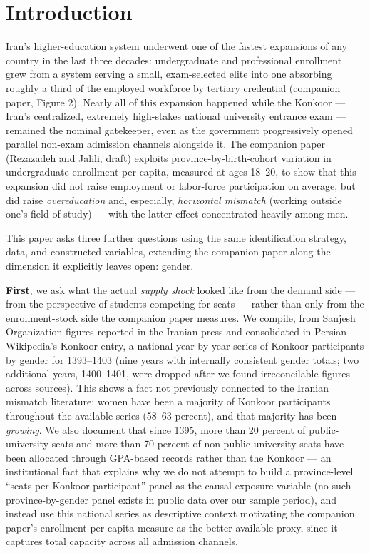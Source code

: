 \documentclass[11pt]{article}
\begin{document}
\section{Introduction}

Iran's higher-education system underwent one of the fastest expansions of any country in the last three decades: undergraduate and professional enrollment grew from a system serving a small, exam-selected elite into one absorbing roughly a third of the employed workforce by tertiary credential (companion paper, Figure 2). Nearly all of this expansion happened while the Konkoor --- Iran's centralized, extremely high-stakes national university entrance exam --- remained the nominal gatekeeper, even as the government progressively opened parallel non-exam admission channels alongside it. The companion paper (Rezazadeh and Jalili, draft) exploits province-by-birth-cohort variation in undergraduate enrollment per capita, measured at ages 18--20, to show that this expansion did not raise employment or labor-force participation on average, but did raise \emph{overeducation} and, especially, \emph{horizontal mismatch} (working outside one's field of study) --- with the latter effect concentrated heavily among men.

This paper asks three further questions using the same identification strategy, data, and constructed variables, extending the companion paper along the dimension it explicitly leaves open: gender.

\textbf{First}, we ask what the actual \emph{supply shock} looked like from the demand side --- from the perspective of students competing for seats --- rather than only from the enrollment-stock side the companion paper measures. We compile, from Sanjesh Organization figures reported in the Iranian press and consolidated in Persian Wikipedia's Konkoor entry, a national year-by-year series of Konkoor participants by gender for 1393--1403 (nine years with internally consistent gender totals; two additional years, 1400--1401, were dropped after we found irreconcilable figures across sources). This shows a fact not previously connected to the Iranian mismatch literature: women have been a majority of Konkoor participants throughout the available series (58--63 percent), and that majority has been \emph{growing}. We also document that since 1395, more than 20 percent of public-university seats and more than 70 percent of non-public-university seats have been allocated through GPA-based records rather than the Konkoor --- an institutional fact that explains why we do not attempt to build a province-level ``seats per Konkoor participant'' panel as the causal exposure variable (no such province-by-gender panel exists in public data over our sample period), and instead use this national series as descriptive context motivating the companion paper's enrollment-per-capita measure as the better available proxy, since it captures total capacity across all admission channels.
\end{document}
